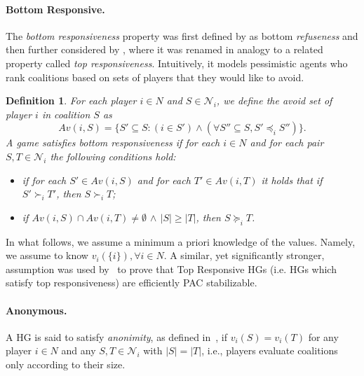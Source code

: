 \documentclass[letterpaper]{article} %
\newtheorem{definition}[theorem]{Definition}
\newcommand{\modulus}[1]{\vert #1 \vert}
\begin{document}
\paragraph{Bottom Responsive.}
The \emph{bottom responsiveness} property was first defined by \citet{suzuki2010hedonic} as bottom \emph{refuseness} and then further considered by \citet{Aziz_BottomResp}, where it was renamed in analogy to a related property called \emph{top responsiveness}. Intuitively, it models pessimistic agents who rank coalitions based on sets of players that they would like to avoid. 

\begin{definition}\label{def:bottom_responsive}
For each player $i\in N$ and $S\in \mathcal{N}_i$, we define the \emph{avoid set} of player $i$ in coalition $S$ as
\[
Av(i,S)=\{S'\subseteq S : (i\in S') \land (\forall S''\subseteq S, S'\preceq_i S'') \}.
\]
A game satisfies \emph{bottom responsiveness} if for each $i\in N$ and for each pair $S,T\in \mathcal{N}_i$ the following conditions hold:
\begin{itemize}
    \item[(i)] if for each $S'\in Av(i,S)$ and for each $T'\in Av(i,T)$ it holds that if $S'\succ_i T'$, then $S\succ_i T$;
    \item[(ii)] if $Av(i,S)\cap Av(i,T)\neq \emptyset$ $\land$ $\modulus{S}\geq \modulus{T}$, then $S\succeq_i T$.
\end{itemize}
\end{definition}

In what follows, we assume a minimum a priori knowledge of the values. Namely, we assume to know $v_i(\{i\}), \forall i\in N$. A similar, yet significantly stronger, assumption was used by~\cite{SliwinskiZ17} to prove that Top Responsive HGs (i.e. HGs which satisfy top responsiveness) are efficiently PAC stabilizable.

\paragraph{Anonymous.}
A HG is said to satisfy \emph{anonimity}, as defined in~\cite{Banerjee01, Bogomolnaia02}, if $v_i(S) = v_i(T)$ for any player $i \in N$ and any $S,T\in \mathcal{N}_i$ with $|S|=|T|$, i.e., players evaluate coalitions only according to their size. 
\end{document}
